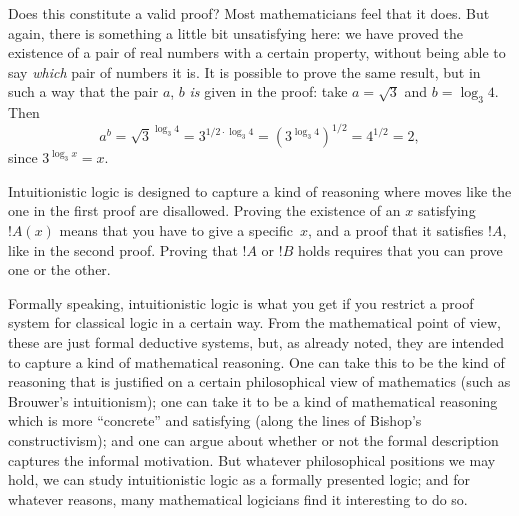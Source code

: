 \documentclass[../../../include/open-logic-chapter]{subfiles}
\begin{document}
Does this constitute a valid proof? Most mathematicians feel that it
does. But again, there is something a little bit unsatisfying here: we
have proved the existence of a pair of real numbers with a certain
property, without being able to say \emph{which} pair of numbers it
is.  It is possible to prove the same result, but in such a way that
the pair $a$, $b$ \emph{is} given in the proof: take $a = \sqrt{3}$
and $b = \log_3 4$. Then
\[
a^b = \sqrt{3}^{\log_3 4} = 3^{1/2 \cdot \log_3 4} = (3^{\log_3
  4})^{1/2} = 4^{1/2}= 2,
\]
since $3^{\log_3 x} = x$.

Intuitionistic logic is designed to capture a kind of reasoning where
moves like the one in the first proof are disallowed. Proving the
existence of an $x$ satisfying~$!A(x)$ means that you have to give a
specific~$x$, and a proof that it satisfies $!A$, like in the second
proof. Proving that $!A$ or $!B$ holds requires that you can prove one
or the other.

Formally speaking, intuitionistic logic is what you get if
you restrict a proof system for classical logic in a certain
way. From the mathematical point of view, these are
just formal deductive systems, but, as already noted, they are
intended to capture a kind of mathematical reasoning. One can take this
to be the kind of reasoning that is justified on a certain
philosophical view of mathematics (such as Brouwer's intuitionism);
one can take it to be a kind of mathematical reasoning which is more
``concrete'' and satisfying (along the lines of Bishop's
constructivism); and one can argue about whether or not the formal
description captures the informal motivation. But whatever
philosophical positions we may hold, we can study intuitionistic logic
as a formally presented logic; and for whatever reasons, many
mathematical logicians find it interesting to do so.

\OLEndChapterHook
\end{document}

